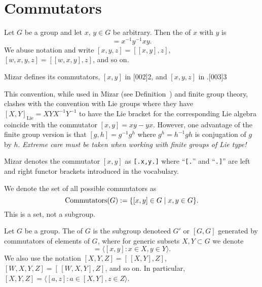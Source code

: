 \section{Commutators}

\begin{definition}
  Let $G$ be a group and let $x$, $y\in G$ be arbitrary.
  Then the  of $x$ with $y$ is
  \begin{equation*}
    [x,y] = x^{-1}y^{-1}xy.
  \end{equation*}
  We abuse notation and write $[x,y,z] = [{[x,y]},z]$,
  $[w,x,y,z] = [{[w,x,y]},z]$, and so on.
\end{definition}

\begin{def-remark}
Mizar defines its commutators, $[x,y]$ in [002]{2}, and
$[x,y,z]$ in .[003]{3}
\end{def-remark}

\begin{def-remark}
This convention, while used in Mizar (see Definition~)
and finite group theory, clashes with the convention with Lie groups
where they have $[X,Y]_{\text{Lie}}=XYX^{-1}Y^{-1}$ to have the Lie
bracket for the corresponding Lie algebra coincide with the commutator
$[x,y] = xy - yx$. However, one advantage of the finite group version is
that $[g,h] = g^{-1}g^{h}$ where $g^{h}=h^{-1}gh$ is conjugation of $g$
by $h$. \emph{Extreme care must be taken when working with finite groups
of Lie type!}
\end{def-remark}

\begin{notation}
  Mizar denotes the commutator $[x,y]$ as \lstinline![.x,y.]! where
  ``\verb#[.#'' and ``\verb#.]#'' are left and right functor brackets
  introduced in the  vocabulary.
\end{notation}

\begin{notation}
  We denote the set of all possible commutators as
  \begin{equation}
\operatorname{Commutators}(G) := \{[x,y]\in G\mid x,y\in G\}.
  \end{equation}
  This is a set, not a subgroup.
\end{notation}

\begin{definition}\index{$[G,G]$}
Let $G$ be a group. The  of $G$ is the subgroup
denoteed $G'$ or $[G,G]$ generated by commutators of elements of $G$, where
for generic subsets $X,Y\subset G$ we denote
\begin{equation}
  [X,Y] = \langle [x,y] : x\in X,y\in Y\rangle.
\end{equation}
We also use the notation $[X,Y,Z] = [\,{[X,Y]},Z]$, $[W,X,Y,Z] = [\,{[W,X,Y]},Z]$,
and so on. In particular, $[X,Y,Z] = \langle [a,z] : a\in[X,Y], z\in Z\rangle$.
\end{definition}

